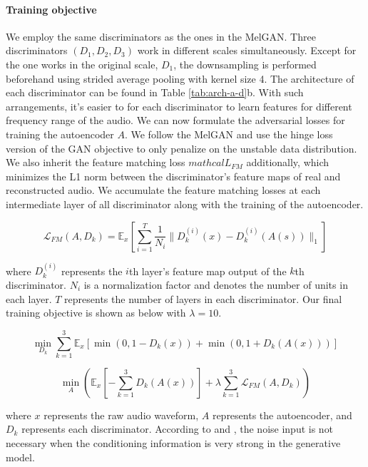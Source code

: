 \documentclass[12pt]{article}
\begin{document}
\paragraph{Training objective}
We employ the same discriminators as the ones in the MelGAN. Three discriminators $(D_1, D_2, D_3)$ work in different scales simultaneously. Except for the one works in the original scale, $D_1$, the downsampling is performed beforehand using strided average pooling with kernel size 4. The architecture of each discriminator can be found in Table \ref{tab:arch-a-d}b. With such arrangements, it's easier to for each discriminator to learn features for different frequency range of the audio. We can now formulate the adversarial losses for training the autoencoder $A$. We follow the MelGAN and use the hinge loss version of the GAN objective \cite{lim17} to only penalize on the unstable data distribution. We also inherit the feature matching loss $mathcal{L}_{FM}$ additionally, which minimizes the L1 norm between the discriminator's feature maps of real and reconstructed audio. We accumulate the feature matching losses at each intermediate layer of all discriminator along with the training of the autoencoder.

\begin{equation}
  \mathcal{L}_{FM}\left( A, D_k\right) =
  \mathbb{E}_x\left[\sum_{i=1}^T \frac{1}{N_i}
  \lVert D_k^{(i)}(x) - D_k^{(i)}(A(s))\rVert_1
  \right]
\end{equation}

where $D_k^{(i)}$ represents the $i$th layer's feature map output of the $k$th discriminator. $N_i$ is a normalization factor and denotes the number of units in each layer. $T$ represents the number of layers in each discriminator. Our final training objective is shown as below with $\lambda = 10$.

\begin{equation}
\min_{D_k}\sum_{k=1}^3\mathbb{E}_x\left[
  \min\left( 0, 1 - D_k\left( x\right)\right) +
  \min\left( 0, 1 + D_k\left( A\left( x\right)\right)\right)
\right]
\end{equation}

\begin{equation}
\min_{A}\left(
  \mathbb{E}_x\left[-\sum_{k=1}^3D_k\left( A\left( x \right)\right)\right] +
  \lambda\sum_{k=1}^3\mathcal{L}_{FM}\left( A, D_k\right)
\right)
\end{equation}

where $x$ represents the raw audio waveform, $A$ represents the autoencoder, and $D_k$ represents each discriminator. According to \cite{mat16} and \cite{iso17}, the noise input is not necessary when the conditioning information is very strong in the generative model.
\end{document}
